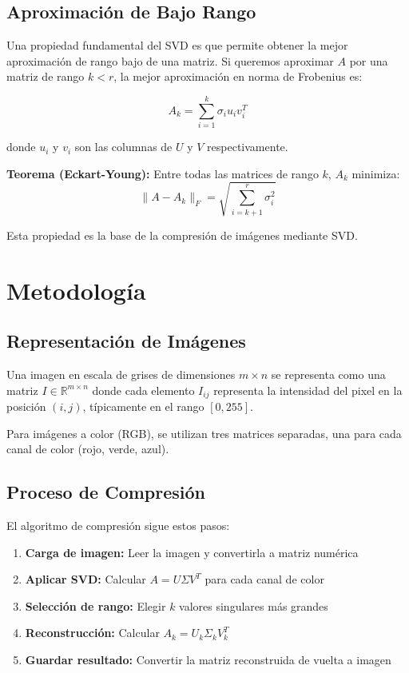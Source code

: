 \documentclass[12pt,a4paper]{article}
\begin{document}
	\subsection{Aproximación de Bajo Rango}
	
	Una propiedad fundamental del SVD es que permite obtener la mejor aproximación de rango bajo de una matriz. Si queremos aproximar $A$ por una matriz de rango $k < r$, la mejor aproximación en norma de Frobenius es:
	
	\begin{equation}
		A_k = \sum_{i=1}^{k} \sigma_i u_i v_i^T
	\end{equation}
	
	donde $u_i$ y $v_i$ son las columnas de $U$ y $V$ respectivamente.
	
	\textbf{Teorema (Eckart-Young):} Entre todas las matrices de rango $k$, $A_k$ minimiza:
	\begin{equation}
		\|A - A_k\|_F = \sqrt{\sum_{i=k+1}^{r} \sigma_i^2}
	\end{equation}
	
	Esta propiedad es la base de la compresión de imágenes mediante SVD.
	
	\section{Metodología}
	
	\subsection{Representación de Imágenes}
	
	Una imagen en escala de grises de dimensiones $m \times n$ se representa como una matriz $I \in \mathbb{R}^{m \times n}$ donde cada elemento $I_{ij}$ representa la intensidad del pixel en la posición $(i,j)$, típicamente en el rango $[0, 255]$.
	
	Para imágenes a color (RGB), se utilizan tres matrices separadas, una para cada canal de color (rojo, verde, azul).
	
	\subsection{Proceso de Compresión}
	
	El algoritmo de compresión sigue estos pasos:
	
	\begin{enumerate}
		\item \textbf{Carga de imagen:} Leer la imagen y convertirla a matriz numérica
		\item \textbf{Aplicar SVD:} Calcular $A = U \Sigma V^T$ para cada canal de color
		\item \textbf{Selección de rango:} Elegir $k$ valores singulares más grandes
		\item \textbf{Reconstrucción:} Calcular $A_k = U_k \Sigma_k V_k^T$
		\item \textbf{Guardar resultado:} Convertir la matriz reconstruida de vuelta a imagen
	\end{enumerate}
	
\end{document}

